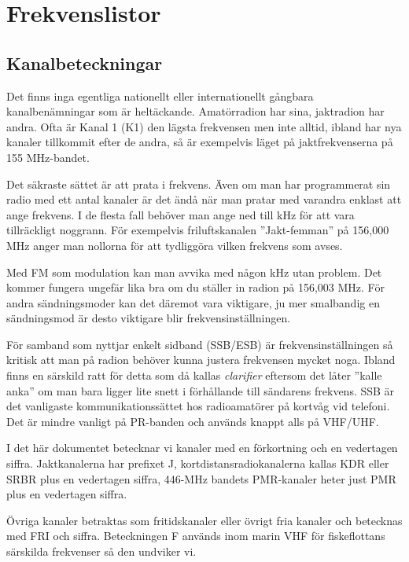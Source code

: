 \documentclass[12ypt,swedish,a4paper]{report}
\begin{document}
\chapter{Frekvenslistor}
\label{kap:frekvenslistor}

\section{Kanalbeteckningar}

Det finns inga egentliga nationellt eller internationellt gångbara kanalbenämningar som är heltäckande. Amatörradion har sina, jaktradion har andra. Ofta är Kanal 1 (K1) den lägsta frekvensen men inte alltid, ibland har nya kanaler tillkommit efter de andra, så är exempelvis läget på jaktfrekvenserna på 155 MHz-bandet.

Det säkraste sättet är att prata i frekvens. Även om man har programmerat sin radio med ett antal kanaler är det ändå när man pratar med varandra enklast att ange frekvens. I de flesta fall behöver man ange ned till kHz för att vara tillräckligt noggrann. För exempelvis friluftskanalen ''Jakt-femman'' på 156,000 MHz anger man nollorna för att tydliggöra vilken frekvens som avses.

Med FM som modulation kan man avvika med någon kHz utan problem. Det kommer fungera ungefär lika bra om du ställer in radion på 156,003 MHz. För andra sändningsmoder kan det däremot vara viktigare, ju mer smalbandig en sändningsmod är desto viktigare blir frekvensinställningen.

För samband som nyttjar enkelt sidband (SSB/ESB) är frekvensinställningen så kritisk att man på radion behöver kunna justera frekvensen mycket noga. Ibland finns en särskild ratt för detta som då kallas \textit{clarifier} eftersom det låter ''kalle anka'' om man bara ligger lite snett i förhållande till sändarens frekvens. SSB är det vanligaste kommunikationssättet hos radioamatörer på kortvåg vid telefoni. Det är mindre vanligt på PR-banden och används knappt alls på VHF/UHF.

I det här dokumentet betecknar vi kanaler med en förkortning och en vedertagen siffra. Jaktkanalerna har prefixet J, kortdistansradiokanalerna kallas KDR eller SRBR plus en vedertagen siffra, 446-MHz bandets PMR-kanaler heter just PMR plus en vedertagen siffra.

Övriga kanaler betraktas som fritidskanaler eller övrigt fria kanaler och betecknas med FRI och siffra. Beteckningen F används inom marin VHF för fiskeflottans särskilda frekvenser så den undviker vi.
\end{document}
